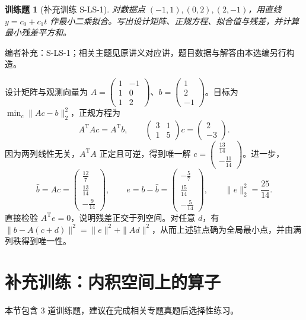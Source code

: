 \documentclass[UTF8,12pt,a4paper,fontset=fandol]{ctexart}
\newtheorem{exercise}{训练题}[section]
\begin{document}
\begin{exercise}[补充训练 S-LS-1]\label{prob:S-LS-1}
对数据点 $(-1,1),(0,2),(2,-1)$，用直线 $y=c_0+c_1t$ 作最小二乘拟合。写出设计矩阵、正规方程、拟合值与残差，并计算最小残差平方和。
\end{exercise}
\noindent 编者补充：S-LS-1；相关主题见原讲义对应讲，题目数据与解答由本选编另行构造。
\begin{solve}
设计矩阵与观测向量为 $A=\begin{pmatrix}1&-1\\1&0\\1&2\end{pmatrix}$、$b=\begin{pmatrix}1\\2\\-1\end{pmatrix}$。目标为 $\min_c\|Ac-b\|_2^2$，正规方程为
\[A^{\mathrm T}Ac=A^{\mathrm T}b,\qquad \begin{pmatrix}3&1\\1&5\end{pmatrix}c=\begin{pmatrix}2\\-3\end{pmatrix}.\]
因为两列线性无关，$A^{\mathrm T}A$ 正定且可逆，得到唯一解 $c=\begin{pmatrix}\frac{13}{14}\\-\frac{11}{14}\end{pmatrix}$。进一步，
\[\widehat b=Ac=\begin{pmatrix}\frac{12}{7}\\\frac{13}{14}\\-\frac{9}{14}\end{pmatrix},\qquad e=b-\widehat b=\begin{pmatrix}-\frac{5}{7}\\\frac{15}{14}\\-\frac{5}{14}\end{pmatrix},\qquad \|e\|_2^2=\frac{25}{14}.\]
直接检验 $A^{\mathrm T}e=0$，说明残差正交于列空间。对任意 $d$，有 $\|b-A(c+d)\|^2=\|e\|^2+\|Ad\|^2$，从而上述驻点确为全局最小点，并由满列秩得到唯一性。
\end{solve}

\section{补充训练：内积空间上的算子}

本节包含 3 道训练题，建议在完成相关专题真题后选择性练习。
\end{document}

